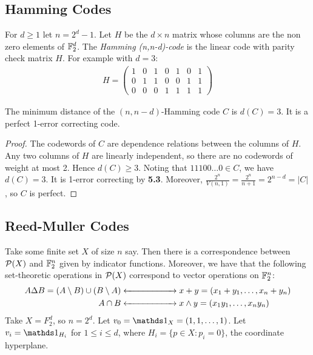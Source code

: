 \documentclass[10pt,a4paper]{article}
\begin{document}
\subsection{Hamming Codes}
For $d \geq 1$ let $n = 2^d - 1$. Let $H$ be the $d \times n$ matrix whose columns are the non zero elements of $\mathbb{F}_2^d$. The \emph{Hamming (n,n-d)-code} is the linear code with parity check matrix $H$. For example with $d = 3$:
\begin{align*}
H = \begin{pmatrix} 1&0&1&0&1&0&1\\0&1&1&0&0&1&1\\0&0&0&1&1&1&1\end{pmatrix}
\end{align*}
\begin{lemma}
The minimum distance of the $(n,n-d)$-Hamming code $C$ is $d(C) = 3$. It is a perfect 1-error correcting code.
\end{lemma}
\begin{proof}
The codewords of $C$ are dependence relations between the columns of $H$. Any two columns of $H$ are linearly independent, so there are no codewords of weight at most 2. Hence $d(C) \geq 3$. Noting that $11100\ldots 0 \in C$, we have $d(C) = 3$. It is 1-error correcting by \textbf{5.3}. Moreover, $\frac{2^n}{V(n,1)} = \frac{2^n}{n+1} = 2^{n-d} = |C|$, so $C$ is perfect.
\end{proof}
\subsection{Reed-Muller Codes}
Take some finite set $X$ of size $n$ say. Then there is a correspondence between $\mathcal{P}(X)$ and $\mathbb{F}_2^n$ given by indicator functions. Moreover, we have that the following set-theoretic operations in $\mathcal{P}(X)$ correspond to vector operations on $\mathbb{F}_2^n$:
\begin{align*}
A \Delta B = (A \setminus B) \cup (B \setminus A) &\xleftrightarrow{\hspace{2cm}} x+y = (x_1+y_1,\ldots, x_n+y_n)\\
A \cap B &\xleftrightarrow{\hspace{2cm}} x \wedge y = (x_1y_1, \ldots, x_ny_n)
\end{align*}
Take $X = F_2^d$, so $n = 2^d$. Let $v_0 = \one_X = (1,1,\ldots, 1)$. Let $v_i = \one_{H_i}$ for $1 \leq i \leq d$, where $H_i = \{p \in X : p_i = 0\}$, the coordinate hyperplane.
\end{document}

